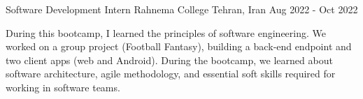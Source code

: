 \begin{cventries}
  \cventry
  {Software Development Intern}
  {Rahnema College}
  {Tehran, Iran}
  {Aug 2022 - Oct 2022}
  {
    \begin{cvitems}
      \item {During this bootcamp, I learned the principles of software engineering. We worked on a group project (Football Fantasy), building a back‑end endpoint and two client apps (web and Android). During the bootcamp, we learned about software architecture, agile methodology, and essential soft skills required for working in software teams.}
    \end{cvitems}
  }


\end{cventries}
